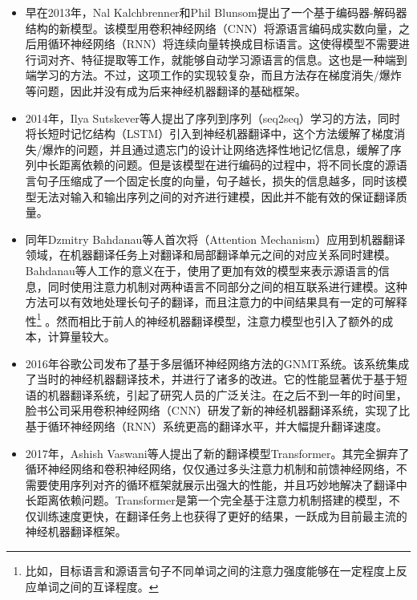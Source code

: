 \begin{itemize}
\vspace{0.3em}
\item 早在2013年，Nal Kalchbrenner和Phil Blunsom提出了一个基于编码器-解码器结构的新模型。该模型用卷积神经网络（CNN）将源语言编码成实数向量，之后用循环神经网络（RNN）将连续向量转换成目标语言。这使得模型不需要进行词对齐、特征提取等工作，就能够自动学习源语言的信息。这也是一种端到端学习的方法。不过，这项工作的实现较复杂，而且方法存在梯度消失/爆炸等问题，因此并没有成为后来神经机器翻译的基础框架。
\vspace{0.3em}
\item 2014年，Ilya Sutskever等人提出了序列到序列（seq2seq）学习的方法，同时将长短时记忆结构（LSTM）引入到神经机器翻译中，这个方法缓解了梯度消失/爆炸的问题，并且通过遗忘门的设计让网络选择性地记忆信息，缓解了序列中长距离依赖的问题。但是该模型在进行编码的过程中，将不同长度的源语言句子压缩成了一个固定长度的向量，句子越长，损失的信息越多，同时该模型无法对输入和输出序列之间的对齐进行建模，因此并不能有效的保证翻译质量。
\vspace{0.3em}
\item 同年Dzmitry Bahdanau等人首次将{\small{}}（Attention Mechanism）应用到机器翻译领域，在机器翻译任务上对翻译和局部翻译单元之间的对应关系同时建模。Bahdanau等人工作的意义在于，使用了更加有效的模型来表示源语言的信息，同时使用注意力机制对两种语言不同部分之间的相互联系进行建模。这种方法可以有效地处理长句子的翻译，而且注意力的中间结果具有一定的可解释性\footnote{比如，目标语言和源语言句子不同单词之间的注意力强度能够在一定程度上反应单词之间的互译程度。} 。然而相比于前人的神经机器翻译模型，注意力模型也引入了额外的成本，计算量较大。
\vspace{0.3em}
\item 2016年谷歌公司发布了基于多层循环神经网络方法的GNMT系统。该系统集成了当时的神经机器翻译技术，并进行了诸多的改进。它的性能显著优于基于短语的机器翻译系统，引起了研究人员的广泛关注。在之后不到一年的时间里，脸书公司采用卷积神经网络（CNN）研发了新的神经机器翻译系统，实现了比基于循环神经网络（RNN）系统更高的翻译水平，并大幅提升翻译速度。
\vspace{0.3em}
\item 2017年，Ashish Vaswani等人提出了新的翻译模型Transformer。其完全摒弃了循环神经网络和卷积神经网络，仅仅通过多头注意力机制和前馈神经网络，不需要使用序列对齐的循环框架就展示出强大的性能，并且巧妙地解决了翻译中长距离依赖问题。Transformer是第一个完全基于注意力机制搭建的模型，不仅训练速度更快，在翻译任务上也获得了更好的结果，一跃成为目前最主流的神经机器翻译框架。
\vspace{0.3em}
\end{itemize}

